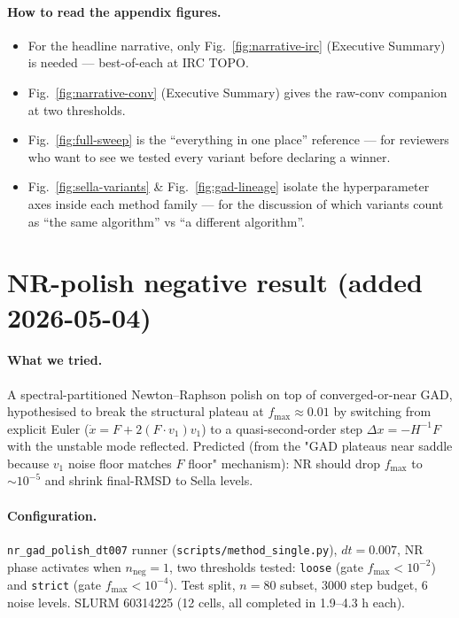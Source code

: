 \documentclass[11pt]{article}
\begin{document}
\paragraph{How to read the appendix figures.}
\begin{itemize}[leftmargin=1.5em]
\item For the headline narrative, only Fig.~\ref{fig:narrative-irc}
  (Executive Summary) is needed — best-of-each at IRC TOPO.
\item Fig.~\ref{fig:narrative-conv} (Executive Summary) gives the
  raw-conv companion at two thresholds.
\item Fig.~\ref{fig:full-sweep} is the ``everything in one place''
  reference — for reviewers who want to see we tested every variant
  before declaring a winner.
\item Fig.~\ref{fig:sella-variants} \& Fig.~\ref{fig:gad-lineage}
  isolate the hyperparameter axes inside each method family — for
  the discussion of which variants count as ``the same algorithm''
  vs ``a different algorithm''.
\end{itemize}

\section{NR-polish negative result (added 2026-05-04)}

\paragraph{What we tried.} A spectral-partitioned Newton--Raphson polish
on top of converged-or-near GAD, hypothesised to break the structural
plateau at $f_{\max}{\approx}0.01$ by switching from explicit Euler
($\dot x = F + 2(F\!\cdot\!v_1)v_1$) to a quasi-second-order step
$\Delta x = -H^{-1} F$ with the unstable mode reflected. Predicted (from
the "GAD plateaus near saddle because $v_1$ noise floor matches $F$
floor" mechanism): NR should drop $f_{\max}$ to $\sim 10^{-5}$ and shrink
final-RMSD to Sella levels.

\paragraph{Configuration.} \texttt{nr\_gad\_polish\_dt007} runner
(\texttt{scripts/method\_single.py}), $dt{=}0.007$, NR phase activates
when $n_{\text{neg}}{=}1$, two thresholds tested: \texttt{loose} (gate
$f_{\max}{<}10^{-2}$) and \texttt{strict} (gate $f_{\max}{<}10^{-4}$).
Test split, $n{=}80$ subset, 3000 step budget, 6 noise levels.
SLURM 60314225 (12 cells, all completed in 1.9--4.3 h each).
\end{document}
